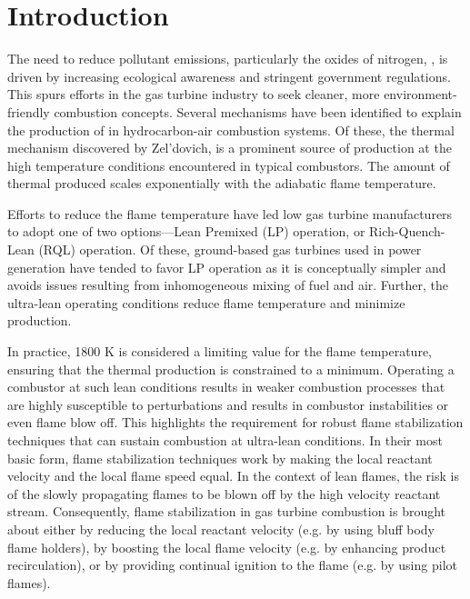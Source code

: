 \chapter{Introduction}
\label{ch:introduction}

The need to reduce pollutant emissions, particularly the oxides of nitrogen, , is driven by increasing ecological awareness and stringent government regulations.
This spurs efforts in the gas turbine industry to seek cleaner, more environment-friendly combustion concepts.
Several mechanisms have been identified to explain the production of  in hydrocarbon-air combustion systems.
Of these, the thermal  mechanism discovered by Zel'dovich, is a prominent source of  production at the high temperature conditions encountered in typical combustors.
The amount of thermal  produced scales exponentially with the adiabatic flame temperature.

Efforts to reduce the flame temperature have led low  gas turbine manufacturers to adopt one of two options---Lean Premixed (LP) operation, or Rich-Quench-Lean (RQL) operation.
Of these, ground-based gas turbines used in power generation have tended to favor LP operation as it is conceptually simpler and avoids issues resulting from inhomogeneous mixing of fuel and air.
Further, the ultra-lean operating conditions reduce flame temperature and minimize  production.

In practice, 1800 K is considered a limiting value for the flame temperature, ensuring that the thermal  production is constrained to a minimum.\cite{1996-glassman}
Operating a combustor at such lean conditions results in weaker combustion processes that are highly susceptible to perturbations and results in combustor instabilities or even flame blow off.
This highlights the requirement for robust flame stabilization techniques that can sustain combustion at ultra-lean conditions.
In their most basic form, flame stabilization techniques work by making the local reactant velocity and the local flame speed equal.
In the context of lean flames, the risk is of the slowly propagating flames to be blown off by the high velocity reactant stream.
Consequently, flame stabilization in gas turbine combustion is brought about either by reducing the local reactant velocity (e.g. by using bluff body flame holders), by boosting the local flame velocity (e.g. by enhancing product recirculation), or by providing continual ignition to the flame (e.g. by using pilot flames).

